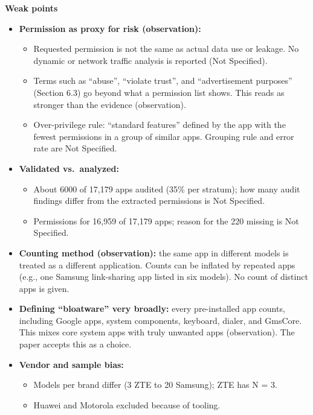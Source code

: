 \documentclass[11pt,a4paper]{article}
\begin{document}
\begin{enumerate}
    \vspace{4pt}
    \textbf{Weak points}
    \begin{itemize}[leftmargin=*, itemsep=1pt, topsep=2pt]
        \item \textbf{Permission as proxy for risk (observation):}
        \begin{itemize}[itemsep=0pt]
            \item Requested permission is not the same as actual data use or leakage. No dynamic or network traffic analysis is reported (Not Specified).
            \item Terms such as ``abuse'', ``violate trust'', and ``advertisement purposes'' (Section 6.3) go beyond what a permission list shows. This reads as stronger than the evidence (observation).
            \item Over-privilege rule: ``standard features'' defined by the app with the fewest permissions in a group of similar apps. Grouping rule and error rate are Not Specified.
        \end{itemize}
        \item \textbf{Validated vs.\ analyzed:}
        \begin{itemize}[itemsep=0pt]
            \item About 6000 of 17,179 apps audited (35\% per stratum); how many audit findings differ from the extracted permissions is Not Specified.
            \item Permissions for 16,959 of 17,179 apps; reason for the 220 missing is Not Specified.
        \end{itemize}
        \item \textbf{Counting method (observation):} the same app in different models is treated as a different application. Counts can be inflated by repeated apps (e.g., one Samsung link-sharing app listed in six models). No count of distinct apps is given.
        \item \textbf{Defining ``bloatware'' very broadly:} every pre-installed app counts, including Google apps, system components, keyboard, dialer, and GmsCore. This mixes core system apps with truly unwanted apps (observation). The paper accepts this as a choice.
        \item \textbf{Vendor and sample bias:}
        \begin{itemize}[itemsep=0pt]
            \item Models per brand differ (3 ZTE to 20 Samsung); ZTE has N = 3.
            \item Huawei and Motorola excluded because of tooling.

\end{itemize}
\end{itemize}
\end{enumerate}
\end{document}
